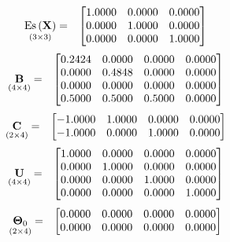\documentclass{glimmpse-report}
\begin{document}
\begin{eqnarray*}
\underset{\left(3\times3\right)}{\text{Es}\left(\mathbf{X}\right)} & = & \begin{bmatrix}1.0000 & 0.0000 & 0.0000\protect\\
0.0000 & 1.0000 & 0.0000\protect\\
0.0000 & 0.0000 & 1.0000\protect\\
\end{bmatrix}
\end{eqnarray*}
\begin{eqnarray*}
\underset{\left(4\times4\right)}{\mathbf{B}} & = & \begin{bmatrix}0.2424 & 0.0000 & 0.0000 & 0.0000\protect\\
0.0000 & 0.4848 & 0.0000 & 0.0000\protect\\
0.0000 & 0.0000 & 0.0000 & 0.0000\protect\\
0.5000 & 0.5000 & 0.5000 & 0.0000\protect\\
\end{bmatrix}
\end{eqnarray*}
\begin{eqnarray*}
\underset{\left(2\times4\right)}{\mathbf{C}} & = & \begin{bmatrix}-1.0000 & 1.0000 & 0.0000 & 0.0000\protect\\
-1.0000 & 0.0000 & 1.0000 & 0.0000\protect\\
\end{bmatrix}
\end{eqnarray*}
\begin{eqnarray*}
\underset{\left(4\times4\right)}{\mathbf{U}} & = & \begin{bmatrix}1.0000 & 0.0000 & 0.0000 & 0.0000\protect\\
0.0000 & 1.0000 & 0.0000 & 0.0000\protect\\
0.0000 & 0.0000 & 1.0000 & 0.0000\protect\\
0.0000 & 0.0000 & 0.0000 & 1.0000\protect\\
\end{bmatrix}
\end{eqnarray*}
\begin{eqnarray*}
\underset{\left(2\times4\right)}{\mathbf{\Theta}_0} & = & \begin{bmatrix}0.0000 & 0.0000 & 0.0000 & 0.0000\protect\\
0.0000 & 0.0000 & 0.0000 & 0.0000\protect\\
\end{bmatrix}
\end{eqnarray*}
\end{document}
